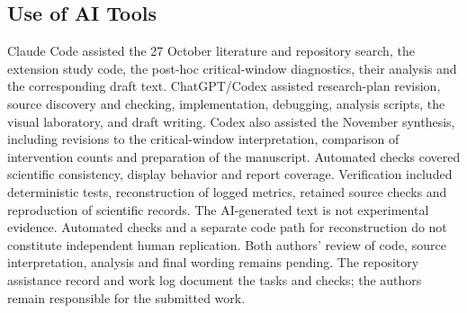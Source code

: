 \subsection{Use of AI Tools}
Claude Code assisted the 27 October literature and repository search, the extension study code, the post-hoc critical-window diagnostics, their analysis and the corresponding draft text. ChatGPT/Codex assisted research-plan revision, source discovery and checking, implementation, debugging, analysis scripts, the visual laboratory, and draft writing. Codex also assisted the November synthesis, including revisions to the critical-window interpretation, comparison of intervention counts and preparation of the manuscript. Automated checks covered scientific consistency, display behavior and report coverage. Verification included deterministic tests, reconstruction of logged metrics, retained source checks and reproduction of scientific records. The AI-generated text is not experimental evidence. Automated checks and a separate code path for reconstruction do not constitute independent human replication. Both authors' review of code, source interpretation, analysis and final wording remains pending. The repository assistance record and work log document the tasks and checks; the authors remain responsible for the submitted work.
